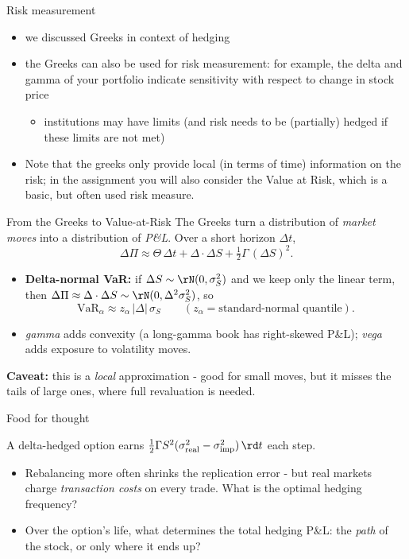 \documentclass[pdf, handout]{beamer}
\begin{document}
\begin{frame}{Risk measurement}
\begin{itemize}
\item we discussed Greeks in context of hedging
\item the Greeks can also be used for risk measurement: for example,
the delta and gamma of your portfolio indicate sensitivity with 
respect to change in stock price
\begin{itemize}
\item institutions may have limits (and risk needs to be (partially) hedged if these limits are not met)
\end{itemize}
\item Note that the greeks only provide local (in terms of time) information on the risk; in the assignment you will also consider the Value at Risk, which is a basic, but often used risk measure. 
\end{itemize}
\end{frame}

\begin{frame}{From the Greeks to Value-at-Risk}
The Greeks turn a distribution of \emph{market moves} into a distribution of \emph{P\&L}. Over a short horizon $\Delta t$,
\[ \Delta\Pi \approx \Theta\,\Delta t + \Delta\cdot\Delta S + \tfrac12\Gamma\,(\Delta S)^2 . \]
\begin{itemize}
\item \textbf{Delta-normal VaR:} if $\Delta S\sim\rN(0,\sigma_S^2)$ and we keep only the linear term, then $\Delta\Pi\approx\Delta\cdot\Delta S\sim\rN(0,\Delta^2\sigma_S^2)$, so
\[ \mathrm{VaR}_\alpha \approx z_\alpha\,|\Delta|\,\sigma_S \qquad (z_\alpha=\text{standard-normal quantile}). \]
\item \emph{gamma} adds convexity (a long-gamma book has right-skewed P\&L); \emph{vega} adds exposure to volatility moves.
\end{itemize}
\textbf{Caveat:} this is a \emph{local} approximation - good for small moves, but it misses the tails of large ones, where full revaluation is needed.
\end{frame}

\begin{frame}{Food for thought}
\begin{fftbox}
A delta-hedged option earns $\tfrac12\Gamma S^2(\sigma_{\text{real}}^2-\sigma_{\text{imp}}^2)\,\rd t$ each step.
\begin{itemize}
\item Rebalancing more often shrinks the replication error - but real markets charge \emph{transaction costs} on every trade. What is the optimal hedging frequency?
\item Over the option's life, what determines the total hedging P\&L: the \emph{path} of the stock, or only where it ends up?
\end{itemize}
\end{fftbox}
\end{frame}
\end{document}
